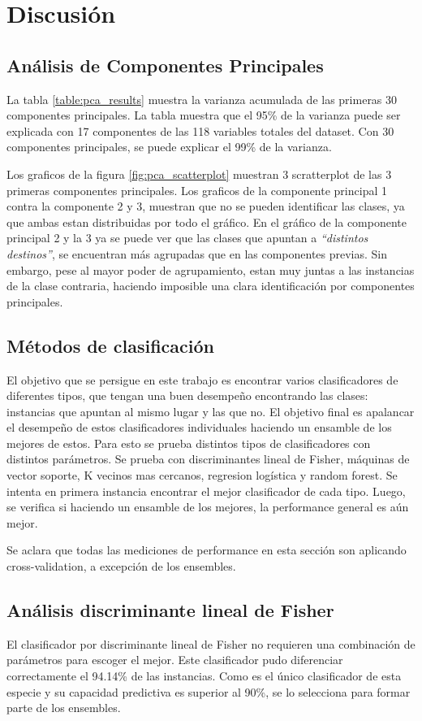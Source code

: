 \documentclass[journal]{IEEEtran}
\begin{document}
\section{Discusión}
\subsection{Análisis de Componentes Principales}
La tabla \ref{table:pca_results} muestra la varianza acumulada de las
primeras 30 componentes principales. La tabla muestra que el 95\%
de la varianza puede ser explicada con 17 componentes de las 118 variables
totales del dataset. Con 30 componentes principales, se puede explicar
el 99\% de la varianza.

Los graficos de la figura \ref{fig:pca_scatterplot} muestran 3 scratterplot de
las 3 primeras componentes principales. Los graficos de la componente principal 1 
contra la componente 2 y 3, muestran que no se pueden identificar las clases, ya
que ambas estan distribuidas por todo el gráfico. En el gráfico de la
componente principal 2 y la 3 ya se puede ver que las clases que apuntan
a \textit{``distintos destinos''}, se encuentran más agrupadas que en las componentes
previas. Sin embargo, pese al mayor poder de agrupamiento, estan muy juntas a
las instancias de la clase contraria, haciendo imposible una clara identificación por
componentes principales.

\subsection{Métodos de clasificación}
El objetivo que se persigue en este trabajo es encontrar varios clasificadores
de diferentes tipos, que tengan una buen desempeño encontrando las clases:
instancias que apuntan al mismo lugar y las que no. El objetivo final es apalancar
el desempeño de estos clasificadores individuales haciendo un ensamble
de los mejores de estos. 
Para esto se prueba distintos tipos de clasificadores con distintos parámetros.
Se prueba con discriminantes lineal de Fisher, 
máquinas de vector soporte, K vecinos mas cercanos, regresion logística
y random forest. Se intenta en primera 
instancia encontrar el mejor clasificador de cada tipo. Luego, se verifica si
haciendo un ensamble de los mejores, la performance general es aún mejor.

Se aclara que todas las mediciones de performance en esta
sección son aplicando cross-validation, a excepción de los ensembles.

\subsection{Análisis discriminante lineal de Fisher}
El clasificador por discriminante lineal de Fisher no requieren una combinación 
de parámetros para escoger el mejor. Este clasificador pudo diferenciar correctamente
el 94.14\% de las instancias. Como es el único clasificador de esta especie
y su capacidad predictiva es superior al 90\%, se lo selecciona para
formar parte de los ensembles.
\end{document}
